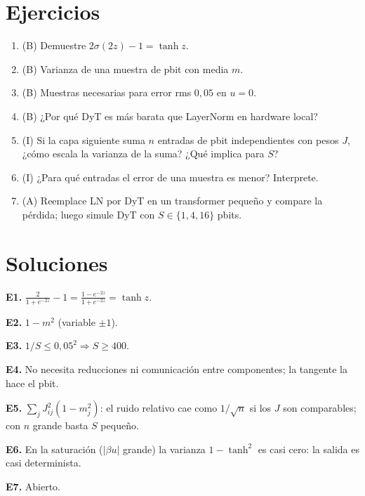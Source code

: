 \documentclass[11pt,a4paper]{article}
\begin{document}
\section{Ejercicios}
\begin{enumerate}[label=\textbf{E\arabic*.}]
\item (B) Demuestre $2\sigma(2z)-1=\tanh z$.
\item (B) Varianza de una muestra de pbit con media $m$.
\item (B) Muestras necesarias para error rms $0{,}05$ en $u=0$.
\item (B) ¿Por qué DyT es más barata que LayerNorm en hardware local?
\item (I) Si la capa siguiente suma $n$ entradas de pbit independientes con pesos $J$, ¿cómo escala la varianza de la suma? ¿Qué implica para $S$?
\item (I) ¿Para qué entradas el error de una muestra es menor? Interprete.
\item (A) Reemplace LN por DyT en un transformer pequeño y compare la pérdida; luego simule DyT con $S\in\{1,4,16\}$ pbits.
\end{enumerate}
\section{Soluciones}
\begin{solucion}
\textbf{E1.} $\frac{2}{1+e^{-2z}}-1=\frac{1-e^{-2z}}{1+e^{-2z}}=\tanh z$.

\textbf{E2.} $1-m^2$ (variable $\pm1$).

\textbf{E3.} $1/S\le0{,}05^2\Rightarrow S\ge400$.

\textbf{E4.} No necesita reducciones ni comunicación entre componentes; la tangente la hace el pbit.

\textbf{E5.} $\sum_jJ_{ij}^2(1-m_j^2)$: el ruido relativo cae como $1/\sqrt n$ si los $J$ son comparables; con $n$ grande basta $S$ pequeño.

\textbf{E6.} En la saturación ($|\beta u|$ grande) la varianza $1-\tanh^2$ es casi cero: la salida es casi determinista.

\textbf{E7.} Abierto.
\end{solucion}
\end{document}

